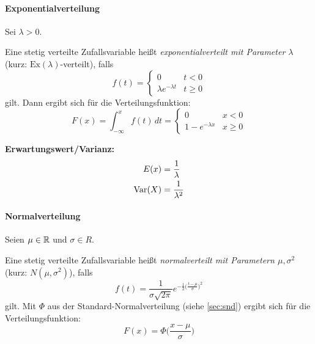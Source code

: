                \paragraph{Exponentialverteilung}
                    Sei \( \lambda > 0 \).
                    
                    Eine stetig verteilte Zufallsvariable heißt \textit{exponentialverteilt mit Parameter \(\lambda\)} (kurz: \( \mathrm{Ex}(\lambda) \)-verteilt), falls
                    \begin{equation*}
                        f(t) =
                        \begin{cases}
                        	0                          & t < 0    \\
                        	\lambda e ^ { -\lambda t } & t \geq 0
                        \end{cases}
                    \end{equation*}
                    gilt. Dann ergibt sich für die Verteilungsfunktion:
                    \begin{equation*}
                        F(x) = \int_{-\infty}^{x} \! f(t) \, dt =
                        \begin{cases}
                        	0                  & x < 0    \\
                        	1 - e^{-\lambda x} & x \geq 0
                        \end{cases}
                    \end{equation*}
                    
                    \textbf{Erwartungswert/Varianz:}
                    \begin{align*}
                    	E(x)    & = \frac{1}{\lambda}   \\
                    	\operatorname{Var}(X) & = \frac{1}{\lambda^2}
                    \end{align*}

                \paragraph{Normalverteilung}
                    Seien \( \mu \in \mathbb{R} \) und \( \sigma \in R \).
                    
                    Eine stetig verteilte Zufallsvariable heißt \textit{normalverteilt mit Parametern \( \mu, \sigma^2 \)} (kurz: \( N(\mu, \sigma^2) \)), falls
                    \begin{equation*}
                        f(t) = \frac{1}{\sigma \sqrt{2\pi}} e^{ -\frac{1}{2} \big( \frac{t - \mu}{\sigma} \big) ^ 2 }
                    \end{equation*}
                    gilt. Mit \( \Phi \) aus der Standard-Normalverteilung (siehe \ref{sec:snd}) ergibt sich für die Verteilungsfunktion:
                    \begin{equation*}
                        F(x) = \Phi\bigg( \frac{x - \mu}{\sigma} \bigg)
                    \end{equation*}
                    
